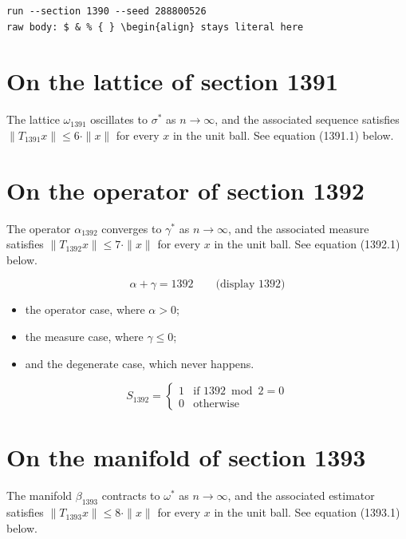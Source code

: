 \documentclass{article}
\begin{document}
\begin{verbatim}
run --section 1390 --seed 288800526
raw body: $ & % { } \begin{align} stays literal here
\end{verbatim}

\section{On the lattice of section 1391}
The lattice $\omega_{1391}$ oscillates to $\sigma^{*}$ as $n \to \infty$,
and the associated sequence satisfies $\|T_{1391} x\| \leq 6 \cdot \|x\|$
for every $x$ in the unit ball. See equation (1391.1) below.

\section{On the operator of section 1392}
The operator $\alpha_{1392}$ converges to $\gamma^{*}$ as $n \to \infty$,
and the associated measure satisfies $\|T_{1392} x\| \leq 7 \cdot \|x\|$
for every $x$ in the unit ball. See equation (1392.1) below.

$$
\alpha + \gamma = 1392 \qquad \text{(display 1392)}
$$

\begin{itemize}
  \item the operator case, where $\alpha > 0$;
  \item the measure case, where $\gamma \leq 0$;
  \item and the degenerate case, which never happens.
\end{itemize}

\begin{equation}
S_{1392} = \begin{cases} 1 & \text{if } 1392 \bmod 2 = 0 \\ 0 & \text{otherwise} \end{cases}
\end{equation}

\section{On the manifold of section 1393}
The manifold $\beta_{1393}$ contracts to $\omega^{*}$ as $n \to \infty$,
and the associated estimator satisfies $\|T_{1393} x\| \leq 8 \cdot \|x\|$
for every $x$ in the unit ball. See equation (1393.1) below.
\end{document}
